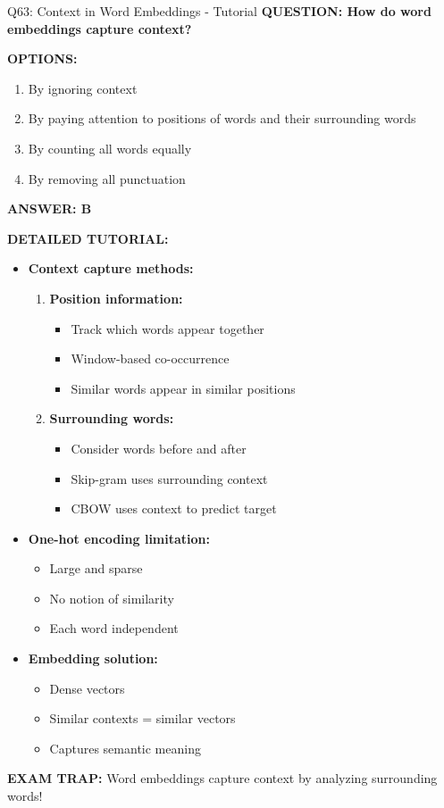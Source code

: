 \documentclass[8pt]{beamer}
\begin{document}
	\begin{frame}{Q63: Context in Word Embeddings - Tutorial}
		\fontsize{6.5}{7.5}\selectfont
		\textbf{QUESTION: How do word embeddings capture context?}
		
		\vspace{0.1cm}
		\textbf{OPTIONS:}
		\begin{enumerate}
			\item By ignoring context
			\item By paying attention to positions of words and their surrounding words
			\item By counting all words equally
			\item By removing all punctuation
		\end{enumerate}
		
		\vspace{0.1cm}
		\textcolor{myblue}{\textbf{ANSWER: B}}
		
		\vspace{0.1cm}
		\textbf{DETAILED TUTORIAL:}
		\begin{itemize}
			\item \textbf{Context capture methods:}
			\begin{enumerate}
				\item \textbf{Position information:}
				\begin{itemize}
					\item Track which words appear together
					\item Window-based co-occurrence
					\item Similar words appear in similar positions
				\end{itemize}
				\item \textbf{Surrounding words:}
				\begin{itemize}
					\item Consider words before and after
					\item Skip-gram uses surrounding context
					\item CBOW uses context to predict target
				\end{itemize}
			\end{enumerate}
			\item \textbf{One-hot encoding limitation:}
			\begin{itemize}
				\item Large and sparse
				\item No notion of similarity
				\item Each word independent
			\end{itemize}
			\item \textbf{Embedding solution:}
			\begin{itemize}
				\item Dense vectors
				\item Similar contexts = similar vectors
				\item Captures semantic meaning
			\end{itemize}
		\end{itemize}
		
		\textcolor{myred}{\textbf{EXAM TRAP:}} Word embeddings capture context by \textcolor{myblue}{analyzing surrounding words}!
	\end{frame}
	
\end{document}
